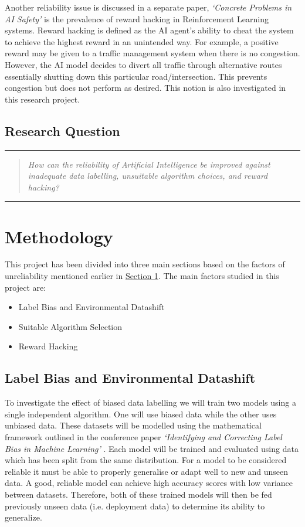 \documentclass[a4paper,12pt]{report}
\begin{document}
\enlargethispage{-\baselineskip}
Another reliability issue is discussed in a separate paper, \textit{‘Concrete Problems in AI Safety’} \cite{Amodei} is the prevalence of reward hacking in Reinforcement Learning systems. 
Reward hacking is defined as the AI agent’s ability to cheat the system to achieve the highest reward in an unintended way. 
For example, a positive reward may be given to a traffic management system when there is no congestion. However, the AI model decides to divert all traffic through alternative routes essentially shutting down this particular road/intersection. 
This prevents congestion but does not perform as desired. This notion is also investigated in this research project.

\section{Research Question}
\noindent\rule{\linewidth}{0.4pt}
\begin{quotation}
\textit{How can the reliability of Artificial Intelligence be improved against 
inadequate data labelling, unsuitable algorithm choices, and reward 
hacking?}
\end{quotation}
\noindent\rule{\linewidth}{0.4pt}

\chapter{Methodology}
This project has been divided into three main sections based on the factors of unreliability mentioned earlier in \hyperref[chap:chap1]{Section 1}. 
The main factors studied in this project are:
\begin{itemize}
    \item Label Bias and Environmental Datashift
    \item Suitable Algorithm Selection
    \item Reward Hacking
\end{itemize}

\section{Label Bias and Environmental Datashift}
To investigate the effect of biased data labelling we will train two models using a single independent algorithm. 
One will use biased data while the other uses unbiased data. 
These datasets will be modelled using the mathematical framework outlined in the conference paper \textit{‘Identifying and Correcting Label Bias in Machine Learning’} \cite{Jiang}. 
Each model will be trained and evaluated using data which has been split from the same distribution. 
For a model to be considered reliable it must be able to properly generalise or adapt well to new and unseen data. 
A good, reliable model can achieve high accuracy scores with low variance between datasets. 
Therefore, both of these trained models will then be fed previously unseen data (i.e. deployment data) to determine its ability to generalize.
\end{document}
